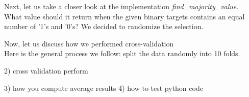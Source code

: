 Next, let us take a closer look at the implementation \emph{find\_majority\_value}.\\
What value should it return when the given binary targets contains an equal number of
'1's and '0's? We decided to randomize the selection.

Now, let us discuss how we performed cross-validation\\
Here is the general process we follow:
split the data randomly into 10 folds.




2) cross validation perform



3) how you compute average results
4) how to test python code

